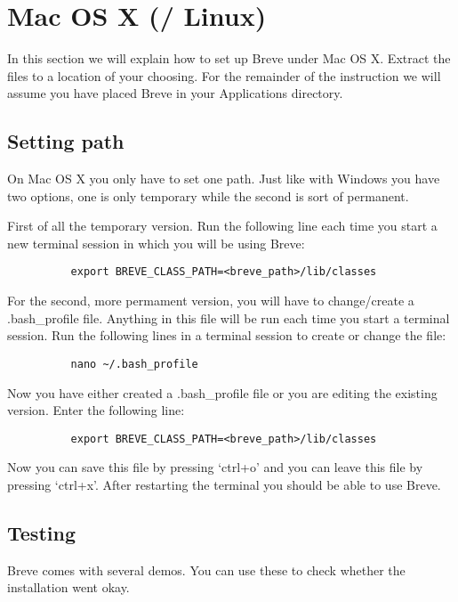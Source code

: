 \section{Mac OS X (/ Linux)}
	In this section we will explain how to set up Breve under Mac OS X. Extract the files to a location of your choosing.  For the remainder of the instruction we will assume you have placed Breve in your Applications directory.
	
\subsection{Setting path}
	On Mac OS X you only have to set one path. Just like with Windows you have two options, one is only temporary while the second is sort of permanent. 

	First of all the temporary version. Run the following line each time you start a new terminal session in which you will be using Breve:
	\begin{verbatim}
		  export BREVE_CLASS_PATH=<breve_path>/lib/classes
	\end{verbatim}

	For the second, more permament version, you will have to change/create a .bash\_profile file. Anything in this file will be run each time you start a terminal session. Run the following lines in a terminal session to create or change the file:
	\begin{verbatim}
		  nano ~/.bash_profile
	\end{verbatim}
	Now you have either created a .bash\_profile file or you are editing the existing version. Enter the following line:
	\begin{verbatim}
		  export BREVE_CLASS_PATH=<breve_path>/lib/classes
	\end{verbatim}
	Now you can save this file by pressing `ctrl+o' and you can leave this file by pressing `ctrl+x'. After restarting the terminal you should be able to use Breve. 

\subsection{Testing}
	Breve comes with several demos. You can use these to check whether the installation went okay. 

